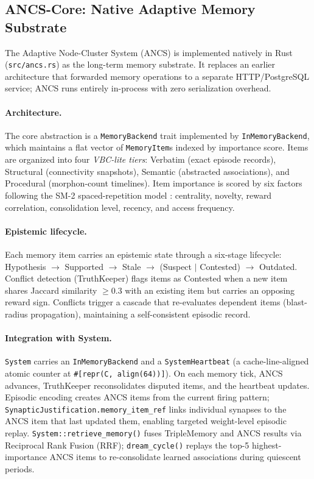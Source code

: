 \subsection{ANCS-Core: Native Adaptive Memory Substrate}
\label{sec:ancs}

The Adaptive Node-Cluster System (ANCS) is implemented natively in Rust (\texttt{src/ancs.rs}) as the long-term memory substrate. It replaces an earlier architecture that forwarded memory operations to a separate HTTP/PostgreSQL service; ANCS runs entirely in-process with zero serialization overhead.

\paragraph{Architecture.}
The core abstraction is a \texttt{MemoryBackend} trait implemented by \texttt{InMemoryBackend}, which maintains a flat vector of \texttt{MemoryItem}s indexed by importance score. Items are organized into four \emph{VBC-lite tiers}: Verbatim (exact episode records), Structural (connectivity snapshots), Semantic (abstracted associations), and Procedural (morphon-count timelines). Item importance is scored by six factors following the SM-2 spaced-repetition model \cite{wozniak1990sm2}: centrality, novelty, reward correlation, consolidation level, recency, and access frequency.

\paragraph{Epistemic lifecycle.}
Each memory item carries an epistemic state through a six-stage lifecycle: Hypothesis $\to$ Supported $\to$ Stale $\to$ (Suspect $|$ Contested) $\to$ Outdated. Conflict detection (TruthKeeper) flags items as Contested when a new item shares Jaccard similarity $\geq 0.3$ with an existing item but carries an opposing reward sign. Conflicts trigger a cascade that re-evaluates dependent items (blast-radius propagation), maintaining a self-consistent episodic record.

\paragraph{Integration with System.}
\texttt{System} carries an \texttt{InMemoryBackend} and a \texttt{SystemHeartbeat} (a cache-line-aligned atomic counter at \texttt{\#[repr(C, align(64))]}). On each memory tick, ANCS advances, TruthKeeper reconsolidates disputed items, and the heartbeat updates. Episodic encoding creates ANCS items from the current firing pattern; \texttt{SynapticJustification.memory\_item\_ref} links individual synapses to the ANCS item that last updated them, enabling targeted weight-level episodic replay. \texttt{System::retrieve\_memory()} fuses TripleMemory and ANCS results via Reciprocal Rank Fusion (RRF); \texttt{dream\_cycle()} replays the top-5 highest-importance ANCS items to re-consolidate learned associations during quiescent periods.

